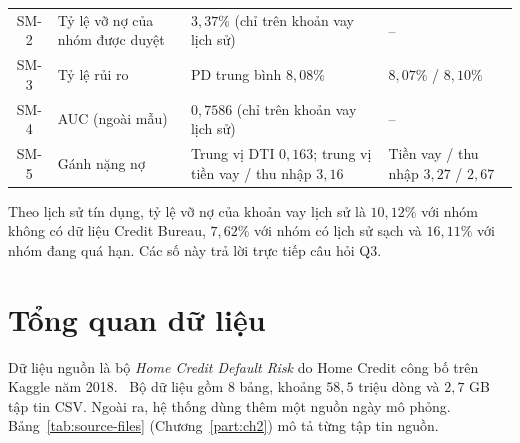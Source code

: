 \begin{table}[H]
\begin{tabular}{c p{3.2cm} p{5.4cm} p{5cm}}
		SM-2        & Tỷ lệ vỡ nợ của nhóm được duyệt & $3{,}37\%$ (chỉ trên khoản vay lịch sử)                                                         & --                                                                                                                 \\
		SM-3        & Tỷ lệ rủi ro                    & PD trung bình $8{,}08\%$                                                                        & $8{,}07\%$ / $8{,}10\%$                                                                                            \\
		SM-4        & AUC (ngoài mẫu)                 & $0{,}7586$ (chỉ trên khoản vay lịch sử)                                                         & --                                                                                                                 \\
		SM-5        & Gánh nặng nợ                    & Trung vị DTI $0{,}163$; trung vị tiền vay / thu nhập $3{,}16$                                   & Tiền vay / thu nhập $3{,}27$ / $2{,}67$                                                                            \\
		\bottomrule
	\end{tabular}
\end{table}

Theo lịch sử tín dụng, tỷ lệ vỡ nợ của khoản vay lịch sử là $10{,}12\%$ với nhóm không có dữ liệu Credit Bureau, $7{,}62\%$ với nhóm có lịch sử sạch và $16{,}11\%$ với nhóm đang quá hạn. Các số này trả lời trực tiếp câu hỏi Q3.

\section{Tổng quan dữ liệu}
\label{sec:data-overview}
Dữ liệu nguồn là bộ \textit{Home Credit Default Risk} do Home Credit công bố trên Kaggle năm 2018.~\cite{homecredit2018} Bộ dữ liệu gồm $8$ bảng, khoảng $58{,}5$ triệu dòng và $2{,}7$ GB tập tin CSV. Ngoài ra, hệ thống dùng thêm một nguồn ngày mô phỏng. Bảng~\ref{tab:source-files} (Chương~\ref{part:ch2}) mô tả từng tập tin nguồn.

\medskip

